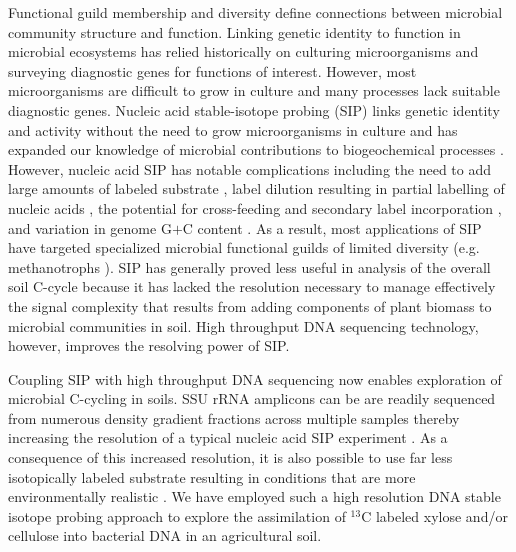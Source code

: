 Functional guild membership and diversity define connections between microbial
community structure and function. Linking genetic identity to function in
microbial ecosystems has relied historically on culturing microorganisms and
surveying diagnostic genes for functions of interest. However, most
microorganisms are difficult to grow in culture \citep{Janssen2006} 
and many processes lack suitable diagnostic genes. Nucleic acid stable-isotope
probing (SIP) links genetic identity and activity without the need to grow
microorganisms in culture and has expanded our knowledge of microbial
contributions to biogeochemical processes \citep{Chen_Murrell_2010}. However,
nucleic acid SIP has notable complications including the need to add large
amounts of labeled substrate \citep{radajewski2000stable}, label dilution
resulting in partial labelling of nucleic acids
\citep{radajewski2000stable,Manefield_2002,McDonald_2005}, the potential for
cross-feeding and secondary label incorporation
\citep{Morris_2002,Hutchens2004,14686943,DeRito2005,McDonald_2005,Ziegler_2005},
and variation in genome G$+$C content
\citep{Buckley_2007,9780408708036,Holben1995,Nusslein1999}. As a result, most
applications of SIP have targeted specialized microbial functional guilds of
limited diversity (e.g. methanotrophs \citep{radajewski2000stable}). SIP has
generally proved less useful in analysis of the overall soil C-cycle because it
has lacked the resolution necessary to manage effectively the signal complexity
that results from adding components of plant biomass to microbial communities
in soil. High throughput DNA sequencing technology, however, improves the
resolving power of SIP. 

Coupling SIP with high throughput DNA sequencing now enables exploration of
microbial C-cycling in soils. SSU rRNA amplicons can be are readily sequenced
from numerous density gradient fractions across multiple samples thereby
increasing the resolution of a typical nucleic acid SIP experiment
\citep{Verastegui_2014}. As a consequence of this increased resolution, it is
also possible to use far less isotopically labeled substrate resulting in
conditions that are more environmentally realistic \citep{Aoyagi2015}. We have
employed such a high resolution DNA stable isotope probing approach to explore
the assimilation of $^{13}$C labeled xylose and/or cellulose into bacterial DNA
in an agricultural soil. 


